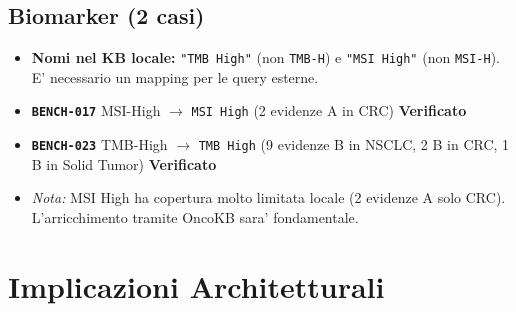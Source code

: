 \documentclass[12pt, a4paper]{article}
\newcommand{\pass}[1]{{\color{passgreen}\textbf{#1}}}
\newcommand{\bench}[1]{{\texttt{\textbf{#1}}}}
\begin{document}
\subsection{Biomarker (2 casi)}
\begin{itemize}[leftmargin=1.6em, itemsep=2pt]
  \item \textbf{Nomi nel KB locale:} \texttt{"TMB High"} (non \texttt{TMB-H}) e \texttt{"MSI High"} (non \texttt{MSI-H}). E' necessario un mapping per le query esterne.
  \item \bench{BENCH-017} MSI-High $\to$ \texttt{MSI High} (2 evidenze A in CRC) \pass{Verificato}
  \item \bench{BENCH-023} TMB-High $\to$ \texttt{TMB High} (9 evidenze B in NSCLC, 2 B in CRC, 1 B in Solid Tumor) \pass{Verificato}
  \item \textit{Nota:} MSI High ha copertura molto limitata locale (2 evidenze A solo CRC). L'arricchimento tramite OncoKB sara' fondamentale.
\end{itemize}

\section{Implicazioni Architetturali}
\end{document}
